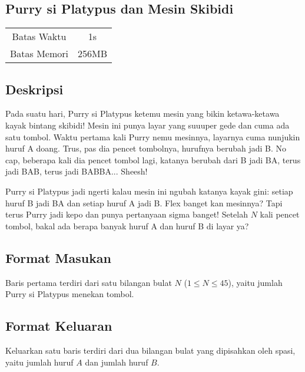 \documentclass{article}
\begin{document}
\begin{center}
    \section*{Purry si Platypus dan Mesin Skibidi} %

    \begin{tabular}{ | c c | }
        \hline
        Batas Waktu  & 1s \\    %
        Batas Memori & 256MB \\  %
        \hline
    \end{tabular}
\end{center}

\subsection*{Deskripsi}

Pada suatu hari, Purry si Platypus ketemu mesin yang bikin ketawa-ketawa kayak bintang skibidi! Mesin ini punya layar yang suuuper gede dan cuma ada satu tombol. Waktu pertama kali Purry nemu mesinnya, layarnya cuma nunjukin huruf A doang. Trus, pas dia pencet tombolnya, hurufnya berubah jadi B. No cap, beberapa kali dia pencet tombol lagi, katanya berubah dari B jadi BA, terus jadi BAB, terus jadi BABBA... Sheesh!

Purry si Platypus jadi ngerti kalau mesin ini ngubah katanya kayak gini: setiap huruf B jadi BA dan setiap huruf A jadi B. Flex banget kan mesinnya? Tapi terus Purry jadi kepo dan punya pertanyaan sigma banget! Setelah $N$ kali pencet tombol, bakal ada berapa banyak huruf A dan huruf B di layar ya?

\subsection*{Format Masukan}

Baris pertama terdiri dari satu bilangan bulat $N$ ($1 \leq N \leq 45$), yaitu jumlah Purry si Platypus menekan tombol.

\subsection*{Format Keluaran}

Keluarkan satu baris terdiri dari dua bilangan bulat yang dipisahkan oleh spasi, yaitu jumlah huruf $A$ dan jumlah huruf $B$.
\\
\end{document}
